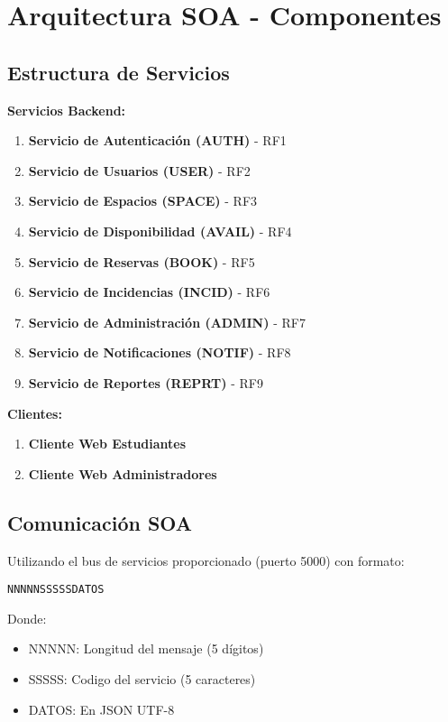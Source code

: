 \documentclass[a4paper, titlepage, 12pt]{article}
\begin{document}
\section{Arquitectura SOA - Componentes}

\subsection{Estructura de Servicios}

\textbf{Servicios Backend:}
\begin{enumerate}
    \item \textbf{Servicio de Autenticación (AUTH)} - RF1
    \item \textbf{Servicio de Usuarios (USER)} - RF2
    \item \textbf{Servicio de Espacios (SPACE)} - RF3
    \item \textbf{Servicio de Disponibilidad (AVAIL)} - RF4
    \item \textbf{Servicio de Reservas (BOOK)} - RF5
    \item \textbf{Servicio de Incidencias (INCID)} - RF6
    \item \textbf{Servicio de Administración (ADMIN)} - RF7
    \item \textbf{Servicio de Notificaciones (NOTIF)} - RF8
    \item \textbf{Servicio de Reportes (REPRT)} - RF9
\end{enumerate}

\textbf{Clientes:}
\begin{enumerate}
    \item \textbf{Cliente Web Estudiantes}
    \item \textbf{Cliente Web Administradores}
\end{enumerate}

\subsection{Comunicación SOA}
Utilizando el bus de servicios proporcionado (puerto 5000) con formato:
\begin{verbatim}
NNNNNSSSSSDATOS
\end{verbatim}
Donde:
\begin{itemize}
    \item NNNNN: Longitud del mensaje (5 dígitos)
    \item SSSSS: Codigo del servicio (5 caracteres)
    \item DATOS: En JSON UTF-8
\end{itemize}
\end{document}
